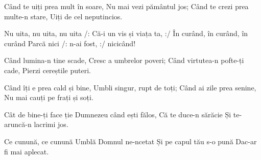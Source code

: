 \beginverse
Când te uiți prea mult în soare,
Nu mai vezi pământul jos;
Când te crezi prea multe-n stare,
Uiți de cel neputincios.
\endverse

\beginchorus
Nu uita, nu uita, nu uita
/: Că-i un vis și viața ta, :/
În curând, în curând, în curând
Parcă nici /: n-ai fost, :/ nicicând!
\endchorus

\beginverse
Când lumina-n tine scade,
Cresc a umbrelor poveri;
Când virtutea-n pofte-ți cade,
Pierzi cereștile puteri.
\endverse

\beginverse
Când îți e prea cald și bine,
Umbli singur, rupt de toți;
Când ai zile prea senine,
Nu mai cauți pe frați și soți.
\endverse

\beginverse
Cât de bine-ți face ție
Dumnezeu când ești fălos,
Că te duce-n sărăcie
Și te-aruncă-n lacrimi jos.
\endverse

\beginverse
Ce cunună, ce cunună
Umblă Domnul ne-ncetat
Și pe capul tău s-o pună
Dac-ar fi mai aplecat.
\endverse
\endsong